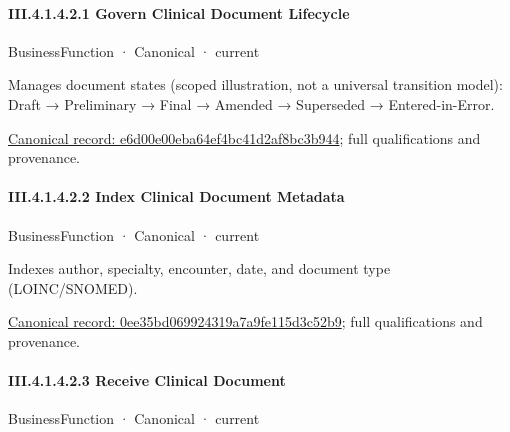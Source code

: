 \paragraph*{III.4.1.4.2.1 Govern Clinical Document Lifecycle}
\label{navigation:III.4.1.4.2.1}

\label{element:e6d00e00eba64ef4bc41d2af8bc3b944}
{\small BusinessFunction · Canonical · current}\par

Manages document states (scoped illustration, not a universal transition model): Draft → Preliminary → Final → Amended → Superseded → Entered-in-Error.


{\footnotesize \href{../../../../continuum/business/business-function/e6d00e00eba64ef4bc41d2af8bc3b944.md}{Canonical record: e6d00e00eba64ef4bc41d2af8bc3b944}; full qualifications and provenance.}\par
\paragraph*{III.4.1.4.2.2 Index Clinical Document Metadata}
\label{navigation:III.4.1.4.2.2}

\label{element:0ee35bd069924319a7a9fe115d3c52b9}
{\small BusinessFunction · Canonical · current}\par

Indexes author, specialty, encounter, date, and document type (LOINC/SNOMED).


{\footnotesize \href{../../../../continuum/business/business-function/0ee35bd069924319a7a9fe115d3c52b9.md}{Canonical record: 0ee35bd069924319a7a9fe115d3c52b9}; full qualifications and provenance.}\par
\paragraph*{III.4.1.4.2.3 Receive Clinical Document}
\label{navigation:III.4.1.4.2.3}

\label{element:d8f80ba3a5a9401b84e6476cbec8cace}
{\small BusinessFunction · Canonical · current}\par

